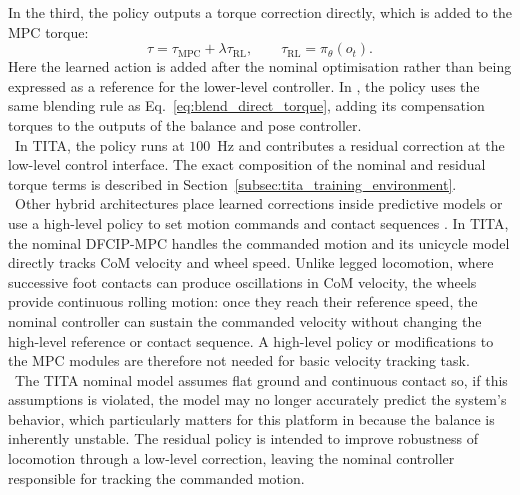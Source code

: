 %
In the third, the policy outputs a torque correction directly, which is added
to the MPC torque:
%
\begin{equation}
    \tau = \tau_{\mathrm{MPC}} + \lambda \tau_{\mathrm{RL}},
    \qquad \tau_{\mathrm{RL}} = \pi_\theta(o_t).
    \label{eq:blend_direct_torque}
\end{equation}
%
Here the learned action is added after the nominal optimisation rather than
being expressed as a reference for the lower-level controller. In
\cite{hybrid_balance}, the policy uses the same blending rule as
Eq.~\eqref{eq:blend_direct_torque}, adding its compensation torques to the
outputs of the balance and pose controller.\\
\
In TITA, the policy runs at \(100\)~Hz and contributes a residual correction
at the low-level control interface. The exact composition of the nominal and
residual torque terms is described in Section~\ref{subsec:tita_training_environment}.\\
\
Other hybrid architectures place learned corrections inside predictive
models or use a high-level policy to set motion commands and contact
sequences \cite{model_gap,modular_residual,adaptive_mpc,non_gaited,
deep_tracking}. In TITA, the nominal DFCIP-MPC handles the commanded motion
and its unicycle model directly tracks CoM velocity and wheel speed. Unlike
legged locomotion, where successive foot contacts can produce oscillations in
CoM velocity, the wheels provide continuous rolling motion: once they reach
their reference speed, the nominal controller can sustain the commanded
velocity without changing the high-level reference or contact sequence. A
high-level policy or modifications to the MPC modules are therefore not
needed for basic velocity tracking task.\\
\
The TITA nominal model assumes flat ground and continuous contact so,
if this assumptions is violated, the model may no longer accurately 
predict the system's behavior, which particularly 
matters for this platform in because the balance is inherently unstable.
The residual policy is intended
to improve robustness of locomotion through a low-level correction,
leaving the nominal controller responsible for tracking the commanded
motion.
